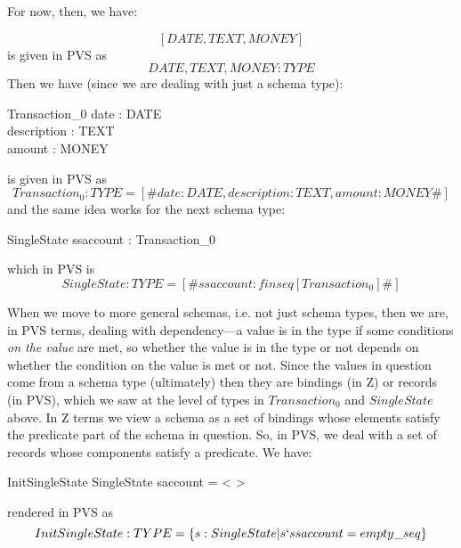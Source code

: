 \documentclass[11pt]{amsart}
\begin{document}
For now, then, we have:

\[
[DATE, TEXT, MONEY]
\]
is given in PVS as
\[
DATE, TEXT, MONEY : TYPE
\]
Then we have (since we are dealing with just a schema type):
\begin{schema}{Transaction_0}
date : DATE\\
description : TEXT\\
amount : MONEY
\end{schema}
is given in PVS as
\[
Transaction_0 : TYPE = [\# date : DATE, description : TEXT, amount : MONEY \#]
\]
and the same idea works for the next schema type:
\begin{schema}{SingleState}
ssaccount : \seq Transaction_0
\end{schema}
which in PVS is
\[
SingleState : TYPE = [\# ssaccount :  finseq[Transaction_0] \#]
\]

When we move to more general schemas, i.e. not just schema types, then we are, in PVS terms, dealing with dependency---a value is in the type if some conditions \emph{on the value} are met, so whether the value is in the type or not depends on whether the condition on the value is met or not. Since the values in question come from a schema type (ultimately) then they are bindings (in Z) or records (in PVS), which we saw at the level of types in $Transaction_0$ and $SingleState$ above. In Z terms we view a schema as a set of bindings whose elements satisfy the predicate part of the schema in question. So, in PVS, we deal with a set of records whose components satisfy a predicate. We have:
\begin{schema}{InitSingleState}
SingleState
\where
saccount = < >
\end{schema}
rendered in PVS as
\[
InitSingleState : TYPE = \{ s : SingleState | s`ssaccount = empty\_seq\}
\]
\end{document}

